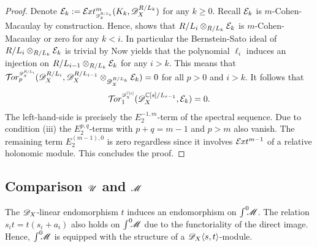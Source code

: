 \begin{proof}
  Denote $\E_{k}:= \Ex{\D_X^{R/L_{k}} }{m}(K_k, \D_X^{R/L_k})$ for any $k\geq 0$.
  Recall $\mathcal{E}_k$ is $m$-Cohen-Macaulay by construction.
  Hence,  shows that $R/L_i\otimes_{R/L_k}\mathcal{E}_{k}$ is $m$-Cohen-Macaulay or zero for any $k<i$.
  In particular the Bernstein-Sato ideal of $R/L_i\otimes_{R/L_k}\mathcal{E}_{k}$ is trivial by 
  Now  yields that the polynomial $\ell_i$ induces an injection on $R/L_{i-1} \otimes_{R/L_k}\mathcal{E}_k$ for any $i>k$.
  This means that $\Tr{\D_X^{R/L_i}}{p}(\D_X^{R/L_i},\D_X^{R/L_{i-1}}\otimes_{\D_X^{R/L_k}} \E_k ) = 0$ for all $p> 0$ and $i> k$.
  It follows that
  $$ \Tr{\D_X^{\C[s]}}{1} (\D_X^{\C[s]/L_{r-1}},\E_k ) = 0.$$
  The left-hand-side is precisely the $E^{-1,m}_2$-term of the spectral sequence.
  Due to condition (iii) the $E^{p,q}_2$-terms with $p+q = m -1$ and $p>m$ also vanish.
  The remaining term $E^{(m -1),0}_2$ is zero regardless since it involves $\mathcal{E}\mkern -1mu xt^{m - 1}$ of a relative holonomic module.
  This concludes the proof.
\end{proof}

\subsection{Comparison $\mathscr{U}$ and $\mathscr{M}$}
  The $\mathscr{D}_X$-linear endomorphism $t$ induces an endomorphism on $\int^0 \mkern -8mu\mathscr{M}$.
  The relation $s_it = t(s_i +a_i)$ also holds on $\int^0 \mkern -8mu\mathscr{M}$ due to the functoriality of the direct image.
  Hence, $\int^0 \mkern -8mu\mathscr{M}$ is equipped with the structure of a $\mathscr{D}_X\langle s,t\rangle$-module.


